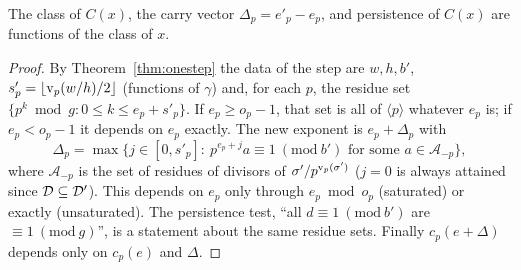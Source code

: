 \begin{lemma}\label{lem:class}
The class of \(C(x)\), the carry vector \(\Delta_p=e'_p-e_p\), and persistence of \(C(x)\) are functions of the class of \(x\).
\end{lemma}
\begin{proof}
By Theorem~\ref{thm:onestep} the data of the step are \(w,h,b'\), \(s'_p=\lfloor\operatorname{v}_p(w/h)/2\rfloor\) (functions of \(\gamma\)) and, for each \(p\), the residue set \(\{p^k\bmod g:0\le k\le e_p+s'_p\}\). If \(e_p\ge o_p-1\), that set is all of \(\langle p\rangle\) whatever \(e_p\) is; if \(e_p<o_p-1\) it depends on \(e_p\) exactly. The new exponent is \(e_p+\Delta_p\) with
\[
\Delta_p=\max\{j\in[0,s'_p]:\ p^{e_p+j}a\equiv1\ (\mathrm{mod}\ b')\text{ for some }a\in\mathcal A_{-p}\},
\]
where \(\mathcal A_{-p}\) is the set of residues of divisors of \(\sigma'/p^{\operatorname{v}_p(\sigma')}\) (\(j=0\) is always attained since \(\mathcal{D}\subseteq\mathcal{D}'\)). This depends on \(e_p\) only through \(e_p\bmod o_p\) (saturated) or exactly (unsaturated). The persistence test, ``all \(d\equiv1\ (\mathrm{mod}\ b')\) are \(\equiv1\ (\mathrm{mod}\ g)\)'', is a statement about the same residue sets. Finally \(c_p(e+\Delta)\) depends only on \(c_p(e)\) and \(\Delta\).
\end{proof}

